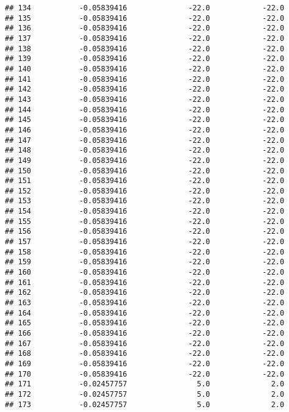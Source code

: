 \documentclass[]{article}
\begin{document}
\begin{verbatim}
## 134           -0.05839416              -22.0            -22.0
## 135           -0.05839416              -22.0            -22.0
## 136           -0.05839416              -22.0            -22.0
## 137           -0.05839416              -22.0            -22.0
## 138           -0.05839416              -22.0            -22.0
## 139           -0.05839416              -22.0            -22.0
## 140           -0.05839416              -22.0            -22.0
## 141           -0.05839416              -22.0            -22.0
## 142           -0.05839416              -22.0            -22.0
## 143           -0.05839416              -22.0            -22.0
## 144           -0.05839416              -22.0            -22.0
## 145           -0.05839416              -22.0            -22.0
## 146           -0.05839416              -22.0            -22.0
## 147           -0.05839416              -22.0            -22.0
## 148           -0.05839416              -22.0            -22.0
## 149           -0.05839416              -22.0            -22.0
## 150           -0.05839416              -22.0            -22.0
## 151           -0.05839416              -22.0            -22.0
## 152           -0.05839416              -22.0            -22.0
## 153           -0.05839416              -22.0            -22.0
## 154           -0.05839416              -22.0            -22.0
## 155           -0.05839416              -22.0            -22.0
## 156           -0.05839416              -22.0            -22.0
## 157           -0.05839416              -22.0            -22.0
## 158           -0.05839416              -22.0            -22.0
## 159           -0.05839416              -22.0            -22.0
## 160           -0.05839416              -22.0            -22.0
## 161           -0.05839416              -22.0            -22.0
## 162           -0.05839416              -22.0            -22.0
## 163           -0.05839416              -22.0            -22.0
## 164           -0.05839416              -22.0            -22.0
## 165           -0.05839416              -22.0            -22.0
## 166           -0.05839416              -22.0            -22.0
## 167           -0.05839416              -22.0            -22.0
## 168           -0.05839416              -22.0            -22.0
## 169           -0.05839416              -22.0            -22.0
## 170           -0.05839416              -22.0            -22.0
## 171           -0.02457757                5.0              2.0
## 172           -0.02457757                5.0              2.0
## 173           -0.02457757                5.0              2.0

\end{verbatim}
\end{document}
